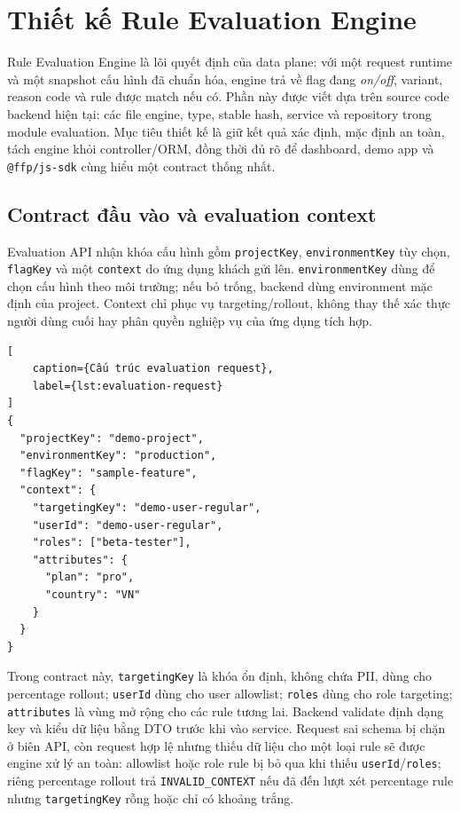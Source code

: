 \section{Thiết kế Rule Evaluation Engine}

Rule Evaluation Engine là lõi quyết định của data plane: với một request runtime và một snapshot cấu hình đã chuẩn hóa, engine trả về flag đang \textit{on/off}, variant, reason code và rule được match nếu có. Phần này được viết dựa trên source code backend hiện tại: các file engine, type, stable hash, service và repository trong module evaluation. Mục tiêu thiết kế là giữ kết quả xác định, mặc định an toàn, tách engine khỏi controller/ORM, đồng thời đủ rõ để dashboard, demo app và \texttt{@ffp/js-sdk} cùng hiểu một contract thống nhất.

\subsection{Contract đầu vào và evaluation context}

Evaluation API nhận khóa cấu hình gồm \texttt{projectKey}, \texttt{environmentKey} tùy chọn, \texttt{flagKey} và một \texttt{context} do ứng dụng khách gửi lên. \texttt{environmentKey} dùng để chọn cấu hình theo môi trường; nếu bỏ trống, backend dùng environment mặc định của project. Context chỉ phục vụ targeting/rollout, không thay thế xác thực người dùng cuối hay phân quyền nghiệp vụ của ứng dụng tích hợp.

\begin{lstlisting}[
    caption={Cấu trúc evaluation request},
    label={lst:evaluation-request}
]
{
  "projectKey": "demo-project",
  "environmentKey": "production",
  "flagKey": "sample-feature",
  "context": {
    "targetingKey": "demo-user-regular",
    "userId": "demo-user-regular",
    "roles": ["beta-tester"],
    "attributes": {
      "plan": "pro",
      "country": "VN"
    }
  }
}
\end{lstlisting}

Trong contract này, \texttt{targetingKey} là khóa ổn định, không chứa PII, dùng cho percentage rollout; \texttt{userId} dùng cho user allowlist; \texttt{roles} dùng cho role targeting; \texttt{attributes} là vùng mở rộng cho các rule tương lai. Backend validate định dạng key và kiểu dữ liệu bằng DTO trước khi vào service. Request sai schema bị chặn ở biên API, còn request hợp lệ nhưng thiếu dữ liệu cho một loại rule sẽ được engine xử lý an toàn: allowlist hoặc role rule bị bỏ qua khi thiếu \texttt{userId}/\texttt{roles}; riêng percentage rollout trả \texttt{INVALID\_CONTEXT} nếu đã đến lượt xét percentage rule nhưng \texttt{targetingKey} rỗng hoặc chỉ có khoảng trắng.

